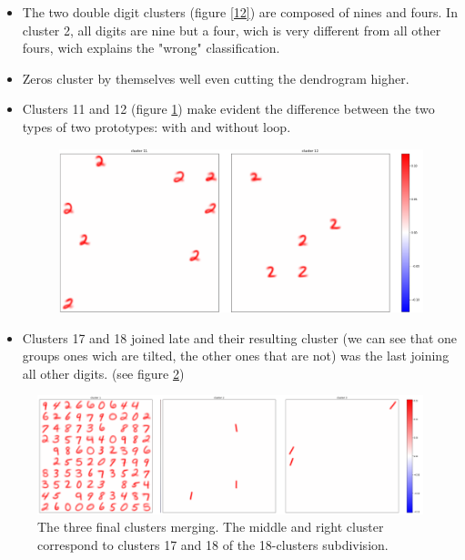 \documentclass[a4paper]{report}
\begin{document}
\begin{itemize}
    \item The two double digit clusters (figure \ref{12}) are composed of nines and fours. In cluster 2, all digits are nine but a four, wich is very different from all other fours, wich explains the "wrong" classification.
    \item Zeros cluster by themselves well even cutting the dendrogram higher.
    
    \item Clusters 11 and 12 (figure \ref{1112}) make evident the difference between the two types of two prototypes: with and without loop.
    
\begin{figure} [H]
    \centering
    \includegraphics [width=\textwidth ] {c/h/11.png}
    \caption{}
    \label{1112}
\end{figure}
    
    \item Clusters 17 and 18 joined late and their resulting cluster (we can see that one groups ones wich are tilted, the other ones that are not) was the last joining all other digits. (see figure \ref{final})
\end{itemize}

\begin{figure} [H]
    \centering
    \includegraphics  [width=\textwidth]  {c/h/final1.png}
    \caption{The three final clusters merging. The middle and right cluster correspond to clusters 17 and 18 of the 18-clusters subdivision.}
    \label{final}
\end{figure}
\end{document}
